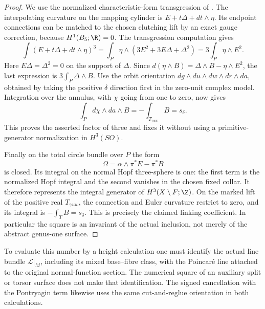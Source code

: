 \begin{proof}
We use the normalized characteristic-form transgression of
\citet[Section 3, Propositions 3.2 and 3.8]{ChernSimons1974E}.
The interpolating curvature on the mapping cylinder is
$E+t\Delta+dt\wedge\eta$. Its endpoint connections can be
matched to the chosen clutching lift by an exact gauge correction,
because $H^1(B_5;\R)=0$. The transgression computation gives
\[
 \int(E+t\Delta+dt\wedge\eta)^3
 =\int_P\eta\wedge(3E^2+3E\Delta+\Delta^2)
 =3\int_P\eta\wedge E^2.
\]
Here $E\Delta=\Delta^2=0$ on the support of $\Delta$. Since
$d(\eta\wedge B)=\Delta\wedge B-\eta\wedge E^2$,
the last expression is $3\int_P\Delta\wedge B$.
Use the orbit orientation
$dg\wedge du\wedge dw\wedge dr\wedge da$, obtained by
taking the positive $\delta$ direction first in the zero-unit
complex model. Integration over the annulus, with $\chi$ going
from one to zero, now gives
\[
 \int_P d\chi\wedge da\wedge B
   =-\int_{T_{\gamma uw}}B=s_\delta.
\]
This proves the asserted factor of three and fixes it without
using a primitive-generator normalization in $H^3(SO)$.

Finally on the total circle bundle over $P$ the form
\[
 \Omega=\alpha\wedge\pi^*E-\pi^*B
\]
is closed. Its integral on the normal Hopf three-sphere is one:
the first term is the normalized Hopf integral and the second
vanishes in the chosen fixed collar. It therefore represents
the integral generator of $H^3(X\setminus F;\Z)$. On the marked
lift of the positive real $T_{\gamma uw}$, the connection and
Euler curvature restrict to zero, and its integral is
$-\int_T B=s_\delta$. This is precisely the claimed linking
coefficient. In particular the square is an invariant of the
actual inclusion, not merely of the abstract genus-one surface.
\end{proof}

\begin{remark}[Scope]
To evaluate this number by a height calculation one must identify
the actual line bundle $\mathcal L|_M$, including its mixed
base--fibre class, with the Poincar\'e line attached to the
original normal-function section. The numerical square of an
auxiliary split or torsor surface does not make that
identification. The signed cancellation with the Pontryagin
term likewise uses the same cut-and-reglue orientation in both
calculations.
\end{remark}
